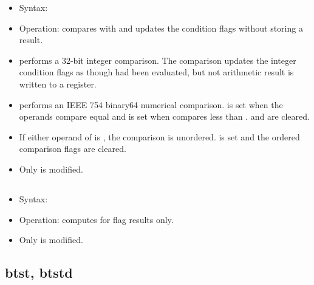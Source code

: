 \begin{itemize}
  \item Syntax: 
  \item Operation: compares  with  and updates the condition
        flags without storing a result.
  \item {} performs a 32-bit integer comparison. The comparison updates
        the integer condition flags as though  had been evaluated,
        but not arithmetic result is written to a register.
  \item {} performs an IEEE 754 binary64 numerical comparison.
         is set when the operands compare equal and  is set when
         compares less than .  and  are cleared.
  \item If either operand of  is , the comparison is unordered.
         is set and the ordered comparison flags are cleared.
  \item Only  is modified.
\end{itemize}

\subsection{}

\begin{itemize}
\item Syntax: 
\item Operation: computes  for flag results only.
\item Only  is modified.
\end{itemize}

\subsection{btst, btstd}

